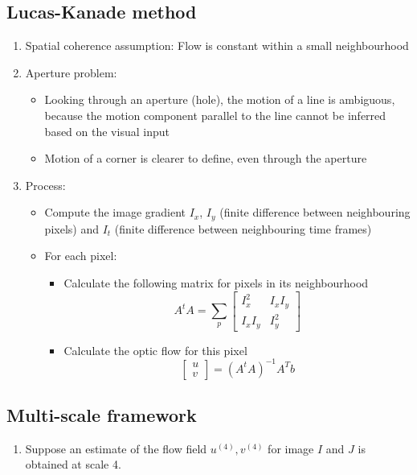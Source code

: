 \documentclass[9pt]{article}
\begin{document}
\begin{multicols*}{2}
    \subsection{Lucas-Kanade method}
    \begin{enumerate}
        \item Spatial coherence assumption: Flow is constant within a small neighbourhood
        \item Aperture problem:
        \begin{itemize}
            \item Looking through an aperture (hole), the motion of a line is ambiguous, because the motion component parallel to the line cannot be 
            inferred based on the visual input
            \item Motion of a corner is clearer to define, even through the aperture
        \end{itemize}

        \item Process:
        \begin{itemize}
            \item Compute the image gradient $I_x$, $I_y$ (finite difference between neighbouring pixels) and $I_t$ (finite difference between neighbouring time frames)
            \item For each pixel:
            \begin{itemize}
                \item Calculate the following matrix for pixels in its neighbourhood
                $$
                    A^tA = \sum_p \begin{bmatrix}
                        I_x^2 & I_x I_y \\ 
                        I_x I_y & I_y^2
                    \end{bmatrix}
                $$

                \item Calculate the optic flow for this pixel 
                $$
                    \begin{bmatrix}
                        u \\ v
                    \end{bmatrix} = (A^t A)^{-1} A^T b
                $$
            \end{itemize}
        \end{itemize}
    \end{enumerate}

    \subsection{Multi-scale framework}
    \begin{enumerate}
        \item Suppose an estimate of the flow field $u^{(4)}, v^{(4)}$ for image $I$ and $J$ is obtained 
        at scale 4.


\end{enumerate}
\end{multicols*}
\end{document}
